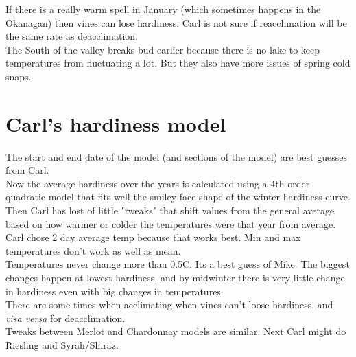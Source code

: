 \documentclass[11pt,letter]{article}
\begin{document}
If there is a really warm spell in January (which sometimes happens in the Okanagan) then vines can lose hardiness. Carl is not sure if reacclimation will be the same rate as deacclimation. \\

The South of the valley breaks bud earlier because there is no lake to keep temperatures from fluctuating a lot. But they also have more issues of spring cold snaps. \\ 

\section {Carl's hardiness model}
The start and end date of the model (and sections of the model) are best guesses from Carl.\\

Now the average hardiness over the years is calculated using a 4th order quadratic model that fits well the smiley face shape of the winter hardiness curve. Then Carl has lost of little "tweaks" that shift values from the general average based on how warmer or colder the temperatures were that year from average. \\

Carl chose 2 day average temp because that works best. Min and max temperatures don't work as well as mean. \\

Temperatures never change more than 0.5\textdegree C. Its a best guess of Mike. The biggest changes happen at lowest hardiness, and by midwinter there is very little change in hardiness even with big changes in temperatures. \\

There are some times when acclimating when vines can't loose hardiness, and \textit{visa versa} for deacclimation. \\

Tweaks between Merlot and Chardonnay models are similar. Next Carl might do Riesling and Syrah/Shiraz. \\
\end{document}
